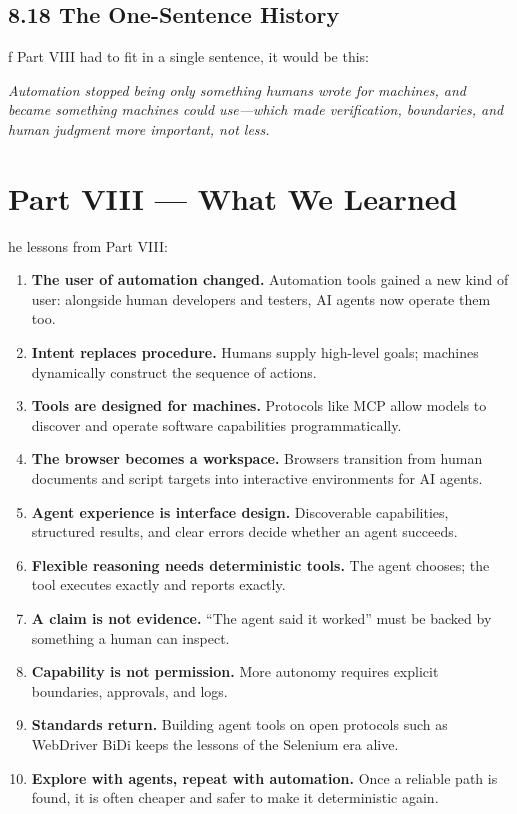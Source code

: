 \documentclass[11pt, a4paper, openany]{book}
\newcommand{\initialcap}[1]{{\fontfamily{lmss}\selectfont\huge\textbf{#1}}}
\begin{document}
\section{8.18 The One-Sentence History}
\noindent \initialcap{I}f Part VIII had to fit in a single sentence, it would be this:
\begin{center}
\textit{Automation stopped being only something humans wrote for machines, and became something machines could use---which made verification, boundaries, and human judgment more important, not less.}
\end{center}

\chapter*{Part VIII --- What We Learned}

\noindent \initialcap{T}he lessons from Part VIII:
\begin{enumerate}
    \item \textbf{The user of automation changed.} Automation tools gained a new kind of user: alongside human developers and testers, AI agents now operate them too.
    \item \textbf{Intent replaces procedure.} Humans supply high-level goals; machines dynamically construct the sequence of actions.
    \item \textbf{Tools are designed for machines.} Protocols like MCP allow models to discover and operate software capabilities programmatically.
    \item \textbf{The browser becomes a workspace.} Browsers transition from human documents and script targets into interactive environments for AI agents.
    \item \textbf{Agent experience is interface design.} Discoverable capabilities, structured results, and clear errors decide whether an agent succeeds.
    \item \textbf{Flexible reasoning needs deterministic tools.} The agent chooses; the tool executes exactly and reports exactly.
    \item \textbf{A claim is not evidence.} ``The agent said it worked'' must be backed by something a human can inspect.
    \item \textbf{Capability is not permission.} More autonomy requires explicit boundaries, approvals, and logs.
    \item \textbf{Standards return.} Building agent tools on open protocols such as WebDriver BiDi keeps the lessons of the Selenium era alive.
    \item \textbf{Explore with agents, repeat with automation.} Once a reliable path is found, it is often cheaper and safer to make it deterministic again.
\end{enumerate}
\end{document}
